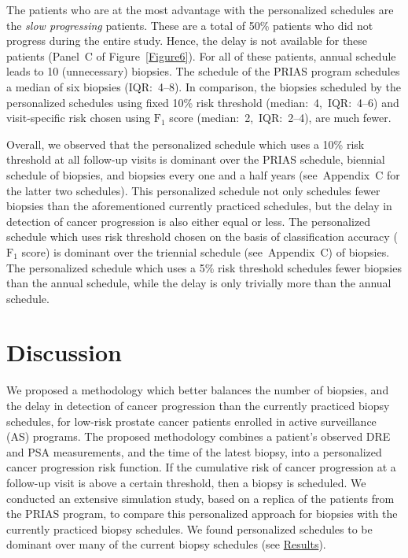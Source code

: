 \documentclass[Afour,sagev,times]{sagej}
\begin{document}
The patients who are at the most advantage with the personalized schedules are the \textit{slow progressing} patients. These are a total of 50\% patients who did not progress during the entire study. Hence, the delay is not available for these patients (Panel~C of Figure~\ref{Figure6}). For all of these patients, annual schedule leads to 10 (unnecessary) biopsies. The schedule of the PRIAS program schedules a median of six biopsies (IQR:~4--8). In comparison, the biopsies scheduled by the personalized schedules using fixed 10\% risk threshold (median:~4,~IQR:~4--6) and visit-specific risk chosen using $\mbox{F}_1$ score (median:~2,~IQR:~2--4), are much fewer.

Overall, we observed that the personalized schedule which uses a 10\% risk threshold at all follow-up visits is dominant over the PRIAS schedule, biennial schedule of biopsies, and biopsies every one and a half years (see~Appendix~C for the latter two schedules). This personalized schedule not only schedules fewer biopsies than the aforementioned currently practiced schedules, but the delay in detection of cancer progression is also either equal or less. The personalized schedule which uses risk threshold chosen on the basis of classification accuracy ($\mbox{F}_1$ score) is dominant over the triennial schedule (see~Appendix~C) of biopsies. The personalized schedule which uses a 5\% risk threshold schedules fewer biopsies than the annual schedule, while the delay is only trivially more than the annual schedule.

\section{Discussion}
\label{sec:discussion}
We proposed a methodology which better balances the number of biopsies, and the delay in detection of cancer progression than the currently practiced biopsy schedules, for low-risk prostate cancer patients enrolled in active surveillance (AS) programs. The proposed methodology combines a patient's observed DRE and PSA measurements, and the time of the latest biopsy, into a personalized cancer progression risk function. If the cumulative risk of cancer progression at a follow-up visit is above a certain threshold, then a biopsy is scheduled. We conducted an extensive simulation study, based on a replica of the patients from the PRIAS program, to compare this personalized approach for biopsies with the currently practiced biopsy schedules. We found personalized schedules to be dominant over many of the current biopsy schedules (see \hyperref[sec:results]{Results}).
\end{document}
